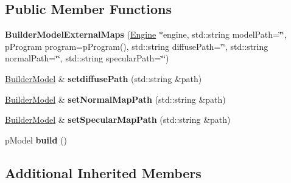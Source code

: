 \subsection*{Public Member Functions}
\begin{DoxyCompactItemize}
\item 
\hypertarget{classfillwave_1_1models_1_1BuilderModelExternalMaps_ab57ba7e42d5ad724114f26e81c313b5d}{}{\bfseries Builder\+Model\+External\+Maps} (\hyperlink{classfillwave_1_1Engine}{Engine} $\ast$engine, std\+::string model\+Path=\char`\"{}\char`\"{}, p\+Program program=p\+Program(), std\+::string diffuse\+Path=\char`\"{}\char`\"{}, std\+::string normal\+Path=\char`\"{}\char`\"{}, std\+::string specular\+Path=\char`\"{}\char`\"{})\label{classfillwave_1_1models_1_1BuilderModelExternalMaps_ab57ba7e42d5ad724114f26e81c313b5d}

\item 
\hypertarget{classfillwave_1_1models_1_1BuilderModelExternalMaps_a8456aeade192f50ed4d8ea369c90f237}{}\hyperlink{classfillwave_1_1models_1_1BuilderModel}{Builder\+Model} \& {\bfseries setdiffuse\+Path} (std\+::string \&path)\label{classfillwave_1_1models_1_1BuilderModelExternalMaps_a8456aeade192f50ed4d8ea369c90f237}

\item 
\hypertarget{classfillwave_1_1models_1_1BuilderModelExternalMaps_a35b04004cdf43446f0ababa8d1f57ccf}{}\hyperlink{classfillwave_1_1models_1_1BuilderModel}{Builder\+Model} \& {\bfseries set\+Normal\+Map\+Path} (std\+::string \&path)\label{classfillwave_1_1models_1_1BuilderModelExternalMaps_a35b04004cdf43446f0ababa8d1f57ccf}

\item 
\hypertarget{classfillwave_1_1models_1_1BuilderModelExternalMaps_a30ef4ffc1a4d9395a25e34bb60a8c4aa}{}\hyperlink{classfillwave_1_1models_1_1BuilderModel}{Builder\+Model} \& {\bfseries set\+Specular\+Map\+Path} (std\+::string \&path)\label{classfillwave_1_1models_1_1BuilderModelExternalMaps_a30ef4ffc1a4d9395a25e34bb60a8c4aa}

\item 
\hypertarget{classfillwave_1_1models_1_1BuilderModelExternalMaps_aaedc7219663a04ac39b46ac670204b86}{}p\+Model {\bfseries build} ()\label{classfillwave_1_1models_1_1BuilderModelExternalMaps_aaedc7219663a04ac39b46ac670204b86}

\end{DoxyCompactItemize}
\subsection*{Additional Inherited Members}


